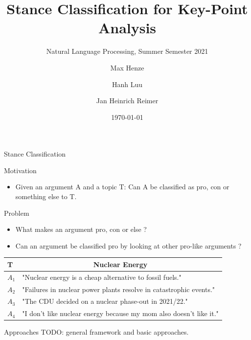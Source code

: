 \documentclass[english,handout]{mlutalk}
\title{Stance Classification for Key-Point Analysis}
\subtitle{Natural Language Processing, Summer Semester 2021}
\author{Max Henze \and Hanh Luu \and Jan Heinrich Reimer}
\institute{Martin Luther University Halle-Wittenberg}
\date{\today}
\begin{document}
\titleframe

\begin{frame}{Stance Classification} 
  \begin{block}{Motivation}
    \begin{itemize}
      \item Given an argument A and a topic T: Can A be classified as pro, con or something else to T.
    \end{itemize}
  \end{block}
  \begin{block}{Problem}
    \begin{itemize}
      \item What makes an argument pro, con or else ? 
      \item Can an argument be classified pro by looking at other pro-like arguments ?
    \end{itemize}
  \end{block}
  \begin{example}
    \begin{tabular}{l|l}
      T & \multicolumn{1}{c}{Nuclear Energy}\\
      \hline
      $A_1$ & "Nuclear energy is a cheap alternative to fossil fuels."\\
      $A_2$ & "Failures in nuclear power plants resolve in catastrophic events."\\
      $A_3$ & "The CDU decided on a nuclear phase-out in 2021/22."\\
      $A_4$ & "I don't like nuclear energy because my mom also doesn't like it."
    \end{tabular}
  \end{example}
\end{frame}

\begin{frame}{Approaches} %
  TODO: general framework and basic approaches.
\end{frame}
\end{document}
